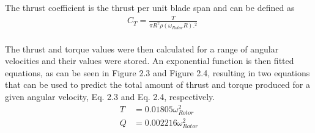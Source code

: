         The thrust coefficient is the thrust per unit blade span and can be defined as
        \begin{align}
            &C_T= \frac{T}{\pi R^2 \rho (\omega_{Rotor} R).^2}
        \end{align}
        \\
        The thrust and torque values were then calculated for a range of angular velocities and their values were stored. An exponential function is then fitted equations, as can be seen in Figure 2.3 and Figure 2.4, resulting
        in two equations that can be used to predict the total amount of thrust and torque produced for a given angular velocity, Eq. 2.3 and Eq. 2.4, respectively.
        \begin{align}
            T &= 0.01805 \omega_{Rotor} ^2 \label{eq: fitted_thrust}\\
            Q &= 0.002216 \omega_{Rotor} ^2 \label{eq: fitted_torque}
        \end{align}



